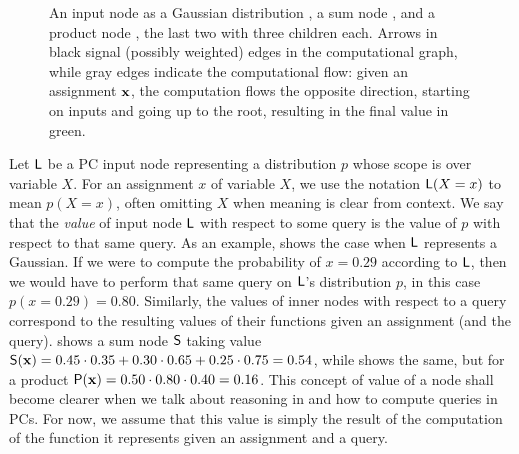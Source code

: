 \begin{figure}[t]
\begin{subfigure}[t]{0.32\textwidth}
{
    }
    \caption{}
    \label{fig:units-prod}
  \end{subfigure}
  \caption{An input node as a Gaussian distribution , a sum node ,
    and a product node , the last two with three children each. Arrows in black
    signal (possibly weighted) edges in the computational graph, while gray edges indicate the
    computational flow: given an assignment \colorbox{boxblue}{\color{white}$\mathbf{x}$}, the
    computation flows the opposite direction, starting on inputs and going up to the root,
    resulting in the final value in \colorbox{boxgreen}{\color{white}\textup{green}}.}
  \label{fig:units}
\end{figure}

Let $\operatorname{\textup{\textsf{L}}}$ be a PC input node representing a distribution $p$ whose scope is over variable $X$.
For an assignment $x$ of variable $X$, we use the notation $\operatorname{\textup{\textsf{L}}}(X=x)$ to mean $p(X=x)$, often
omitting $X$ when meaning is clear from context. We say that the \emph{value} of input node $\operatorname{\textup{\textsf{L}}}$
with respect to some query is the value of $p$ with respect to that same query. As an example,
 shows the case when $\operatorname{\textup{\textsf{L}}}$ represents a Gaussian. If we were to compute the
probability of $x=0.29$ according to $\operatorname{\textup{\textsf{L}}}$, then we would have to perform that same query on
$\operatorname{\textup{\textsf{L}}}$'s distribution $p$, in this case $p(x=0.29)=0.80$. Similarly, the values of inner nodes
with respect to a query correspond to the resulting values of their functions given an assignment
(and the query).  shows a sum node $\operatorname{\textup{\textsf{S}}}$ taking value
$\operatorname{\textup{\textsf{S}}}(\mathbf{x})=0.45\cdot0.35+0.30\cdot 0.65+0.25\cdot 0.75=0.54$, while  shows
the same, but for a product $\operatorname{\textup{\textsf{P}}}(\mathbf{x})=0.50\cdot 0.80\cdot 0.40=0.16$. This concept of value
of a node shall become clearer when we talk about reasoning in  and how to compute
queries in PCs. For now, we assume that this value is simply the result of the computation of the
function it represents given an assignment and a query.

